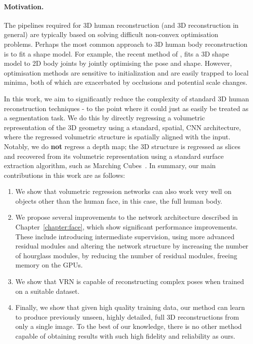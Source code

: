 \paragraph{Motivation.} The pipelines required for 3D human
reconstruction (and 3D reconstruction in general) are typically based
on solving difficult non-convex optimisation problems. Perhaps the
most common approach to 3D human body reconstruction is to fit a shape
model. For example, the recent method of \cite{bogo2016smplify}, fits
a 3D shape model to 2D body joints by jointly optimising the pose and
shape. However, optimisation methods are sensitive to initialization
and are easily trapped to local minima, both of which are exacerbated
by occlusions and potential scale changes.

In this work, we aim to significantly reduce the complexity of
standard 3D human reconstruction techniques - to the point where it
could just as easily be treated as a segmentation task. We do this by
directly regressing a volumetric representation of the 3D geometry
using a standard, spatial, CNN architecture, where the regressed
volumetric structure is spatially aligned with the input. Notably, we
do \textbf{not} regress a depth map; the 3D structure is regressed as
slices and recovered from its volumetric representation using a
standard surface extraction algorithm, such as Marching
Cubes~\cite{lorensen1987marching}. In summary, our main contributions
in this work are as follows:

\begin{enumerate}
\item We show that volumetric regression networks can also work very
  well on objects other than the human face, in this case, the full
  human body.

\item We propose several improvements to the network architecture
  described in Chapter~\ref{chapter:face}, which show significant
  performance improvements. These include introducing intermediate
  supervision, using more advanced residual modules and altering the
  network structure by increasing the number of hourglass modules, by
  reducing the number of residual modules, freeing memory on the GPUs.

\item We show that VRN is capable of reconstructing complex poses when
  trained on a suitable dataset.

\item Finally, we show that given high quality training data, our
  method can learn to produce previously unseen, highly detailed, full
  3D reconstructions from only a single image. To the best of our
  knowledge, there is no other method capable of obtaining results
  with such high fidelity and reliability as ours.
\end{enumerate}

